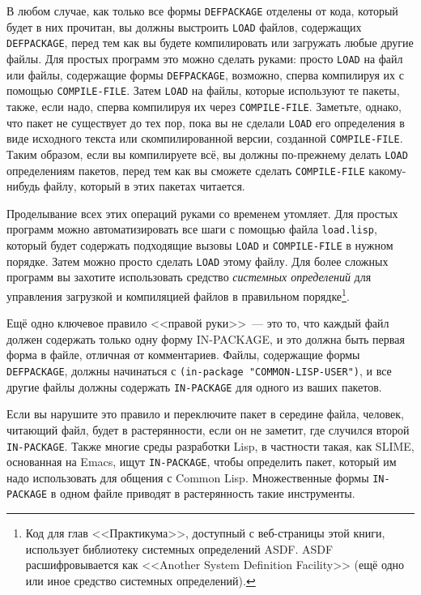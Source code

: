 В любом случае, как только все формы \lstinline{DEFPACKAGE} отделены от кода, который будет в
них прочитан, вы должны выстроить \lstinline{LOAD} файлов, содержащих \lstinline{DEFPACKAGE}, перед
тем как вы будете компилировать или загружать любые другие файлы. Для простых программ
это можно сделать руками: просто \lstinline{LOAD} на файл или файлы, содержащие формы
\lstinline{DEFPACKAGE}, возможно, сперва компилируя их с помощью \lstinline{COMPILE-FILE}. Затем
\lstinline{LOAD} на файлы, которые используют те пакеты, также, если надо, сперва компилируя их
через \lstinline{COMPILE-FILE}. Заметьте, однако, что пакет не существует до тех пор, пока вы
не сделали \lstinline{LOAD} его определения в виде исходного текста или скомпилированной
версии, созданной \lstinline{COMPILE-FILE}. Таким образом, если вы компилируете всё, вы должны
по-прежнему делать \lstinline{LOAD} определениям пакетов, перед тем как вы сможете сделать
\lstinline{COMPILE-FILE} какому-нибудь файлу, который в этих пакетах читается.

Проделывание всех этих операций руками со временем утомляет.  Для простых программ можно
автоматизировать все шаги с помощью файла \lstinline{load.lisp}, который будет содержать
подходящие вызовы \lstinline{LOAD} и \lstinline{COMPILE-FILE} в нужном порядке. Затем можно прос\-то
сделать \lstinline{LOAD} этому файлу. Для более сложных программ вы захотите использовать
средство \textit{системных определений} для управления загрузкой и компиляцией файлов в
правильном порядке\footnote{Код для глав <<Практикума>>, доступный с веб-страницы этой
  книги, использует библиотеку системных определений ASDF. ASDF расшифровывается как
  <<Another System Definition Facility>> (ещё одно или иное средство системных определений).}.

Ещё одно ключевое правило <<правой руки>>~--- это то, что каждый файл должен содержать только
одну форму IN-PACKAGE, и это должна быть первая форма в файле, отличная от комментариев.
Файлы, содержащие формы \lstinline{DEFPACKAGE}, должны начинаться с 
\lstinline{(in-package "COMMON-LISP-USER")}, и все другие файлы должны содержать \lstinline{IN-PACKAGE} для одного из
ваших пакетов.

Если вы нарушите это правило и переключите пакет в середине файла, человек, читающий файл,
будет в растерянности, если он не заметит, где случился второй \lstinline{IN-PACKAGE}. Также
многие среды разработки Lisp, в частности такая, как SLIME, основанная на Emacs, ищут
\lstinline{IN-PACKAGE}, чтобы определить пакет, который им надо использовать для общения с
Common Lisp. Множественные формы \lstinline{IN-PACKAGE} в одном файле приводят в растерянность
такие инструменты.

